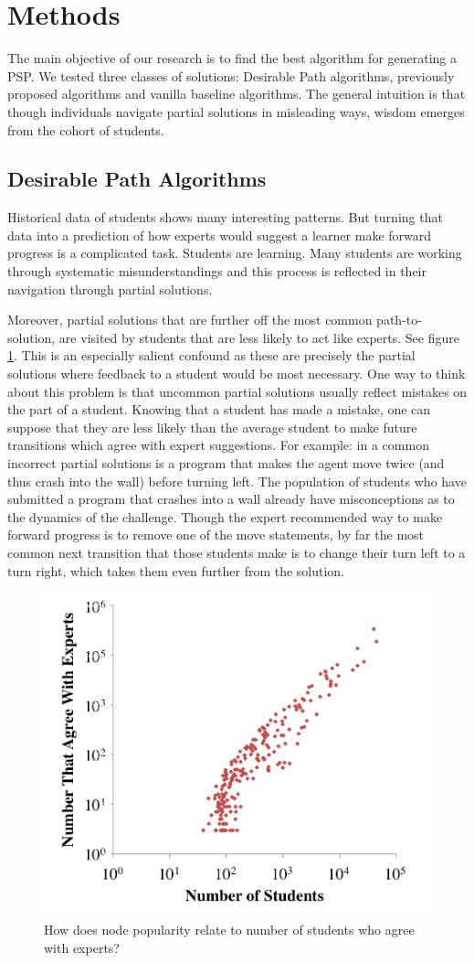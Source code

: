 \section{Methods}

The main objective of our research is to find the best algorithm for generating a PSP. We tested three classes of solutions: Desirable Path algorithms, previously proposed algorithms and vanilla baseline algorithms. The general intuition is that though individuals navigate partial solutions in misleading ways, wisdom emerges from the cohort of students.

\subsection{Desirable Path Algorithms}

Historical data of students shows many interesting patterns.
But turning that data into a prediction of how experts would suggest a learner make forward progress is a complicated task. Students are learning. Many students are working through systematic misunderstandings and this process is reflected in their navigation through partial solutions. 



Moreover, partial solutions that are further off the most common path-to-solution, are visited by students that are less likely to act like experts. See figure \ref{fig:confidence}. This is an especially salient confound as these are precisely the partial solutions where feedback to a student would be most necessary. One way to think about this problem is that uncommon partial solutions usually reflect mistakes on the part of a student. Knowing that a student has made a mistake, one can suppose that they are less likely than the average student to make future transitions which agree with expert suggestions. For example: in \Pa    a common incorrect partial solutions is a program that makes the agent move twice (and thus crash into the wall) before turning left. The population of students who have submitted a program that crashes into a wall already have misconceptions as to the dynamics of the challenge. Though the expert recommended way to make forward progress is to remove one of the move statements, by far the most common next transition that those students make is to change their turn left to a turn right, which takes them even further from the solution.


\begin{figure}
\centering
\includegraphics[width=0.5\columnwidth]{img/wrongVsPopularity.png}
\caption{How does node popularity relate to number of students who agree with experts?}
\label{fig:confidence}
\end{figure}


